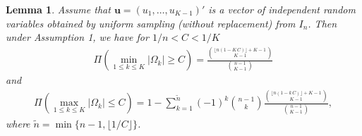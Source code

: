 \documentclass{article}
\newcommand{\1}{\mathbb{I}}
\newcommand{\bm}[1]{\boldsymbol{#1}}
\def\u{\bm{u}}
\newtheorem{lemma}{Lemma}[section]
\theoremstyle{assumption}
\begin{document}
\begin{lemma}\label{lemma:upper_cellsize}
Assume that $\u=(u_1,\dots, u_{K-1})'$ is a vector of independent random variables obtained by uniform sampling (without replacement) from $I_n$. 
Then  under Assumption 1, we have for $1/n<C<1/K$
\vspace{-0.4cm}
\begin{align}
\Pi\left(\min_{1\leq k\leq K}|\Omega_{k}|\geq C \right)= \frac{{{\lfloor n(1-K\,C)\rfloor+K-1} \choose {K-1}}}{{{n-1}\choose {K-1}}}\label{prob_mincell}
\end{align}
and
\vspace{-0.3cm}
\begin{align}\label{prob_maxcell}
\Pi\left(\max_{1\leq k\leq K}|\Omega_{k}|\leq C \right)=1-
\sum_{k=1}^{\widetilde{n}}(-1)^k{n-1\choose k} \frac{{{\lfloor n(1-k\,C)\rfloor+K-1} \choose {K-1}}}{{{n-1}\choose {K-1}}},\end{align}
where $\widetilde{n}=\min\{n-1,\lfloor 1/C\rfloor\}$.
\end{lemma}
\vspace{-0.2cm}
\end{document}
